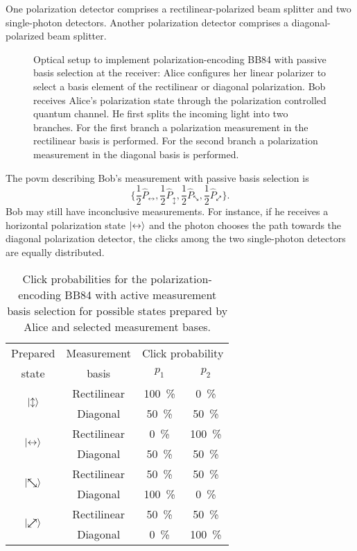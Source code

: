 One polarization detector comprises a rectilinear-polarized beam splitter and two single-photon detectors.
Another polarization detector comprises a diagonal-polarized beam splitter.
\begin{figure}[htb]
	\centering
	
	\caption{Optical setup to implement polarization-encoding BB84 with passive basis selection at the receiver: Alice configures her linear polarizer to select a basis element of the rectilinear or diagonal polarization. Bob receives Alice's polarization state through the polarization controlled quantum channel. He first splits the incoming light into two branches. For the first branch a polarization measurement in the rectilinear basis is performed. For the second branch a polarization measurement in the diagonal basis is performed.}\label{fig:polarization_encoding_passive}
\end{figure}
The \gls{povm} describing Bob's measurement with passive basis selection is
\begin{equation}
	\biggl\{
		\frac{1}{2}\hat{P}_{\leftrightarrow},
		\frac{1}{2}\hat{P}_{\updownarrow},
		\frac{1}{2}\hat{P}_{\nwsearrow},
		\frac{1}{2}\hat{P}_{\neswarrow}
	\biggr\}
	.
\end{equation}
Bob may still have inconclusive measurements.
For instance, if he receives a horizontal polarization state $\ket{\leftrightarrow}$ and the photon chooses the path towards the diagonal polarization detector, the clicks among the two single-photon detectors are equally distributed.
\begin{table}[htb]
	\centering
	\begin{tabular}{cccc}
		\toprule
		Prepared & Measurement & \multicolumn{2}{c}{Click probability} \\
		state & basis & $p_1$ & $p_2$ \\
		\midrule
		\multirow{2}{*}{$\ket{\updownarrow}$} & Rectilinear & \SI{100}{\percent} & \SI{0}{\percent} \\
		& Diagonal & \SI{50}{\percent} & \SI{50}{\percent} \\
		\cmidrule{1-2}
		\multirow{2}{*}{$\ket{\leftrightarrow}$} & Rectilinear & \SI{0}{\percent} & \SI{100}{\percent} \\
		& Diagonal & \SI{50}{\percent} & \SI{50}{\percent} \\
		\cmidrule{1-2}
		\multirow{2}{*}{$\ket{\nwsearrow}$} & Rectilinear & \SI{50}{\percent} & \SI{50}{\percent} \\
		& Diagonal & \SI{100}{\percent} & \SI{0}{\percent} \\
		\cmidrule{1-2}
		\multirow{2}{*}{$\ket{\neswarrow}$} & Rectilinear & \SI{50}{\percent} & \SI{50}{\percent} \\
		& Diagonal & \SI{0}{\percent} & \SI{100}{\percent} \\
		\bottomrule
	\end{tabular}
	\caption{Click probabilities for the polarization-encoding BB84 with active measurement basis selection for possible states prepared by Alice and selected measurement bases.}\label{tab:bb84_polarization_clicks}
\end{table}
